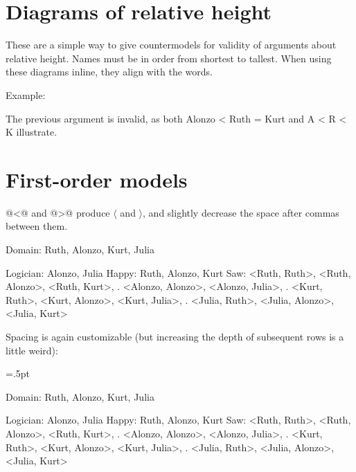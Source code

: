 \section{Diagrams of relative height}

\unorderedlist
\li These are a simple way to give countermodels for validity of arguments about relative height.
\li Names must be in order from shortest to tallest.
\li When using these diagrams inline, they align with the words.
\endunorderedlist

\noindent Example:

\noindent The previous argument is invalid, as both\quad
\heightmodel
 Alonzo < Ruth = Kurt
\endheightmodel
\quad and\quad
\heightmodelinitialbarheight=8pt%
\heightmodelbaradvance=4pt%
\heightmodelbarwidth=4pt%
\heightmodelspace=4pt%
\heightmodel
 A < R < K
\endheightmodel
\quad illustrate.

\pagebreak

\section{First-order models}

@<@ and @>@ produce $\langle$ and $\rangle$, and slightly decrease the space after commas between them.

\firstordermodel 
Domain:    Ruth, Alonzo, Kurt, Julia

Logician:  Alonzo, Julia
Happy:     Ruth, Alonzo, Kurt
Saw:       <Ruth, Ruth>, <Ruth, Alonzo>, <Ruth, Kurt>,
   .       <Alonzo, Alonzo>, <Alonzo, Julia>,
   .       <Kurt, Ruth>, <Kurt, Alonzo>, <Kurt, Julia>,
   .       <Julia, Ruth>, <Julia, Alonzo>, <Julia, Kurt>
\endfirstordermodel

\noindent Spacing is again customizable (but increasing the depth of subsequent rows is a little weird):

\fomodelfirstrowheight=18.5pt \fomodelfirstrowdepth=5.5pt%
\fomodelrowheight=16pt        \fomodelrowdepth=3.5pt%
\fomodelpadding=.5pt%
\fomodelspace=20pt%

\firstordermodel 
Domain:    Ruth, Alonzo, Kurt, Julia

Logician:  Alonzo, Julia
Happy:     Ruth, Alonzo, Kurt
Saw:       <Ruth, Ruth>, <Ruth, Alonzo>, <Ruth, Kurt>,
   .       <Alonzo, Alonzo>, <Alonzo, Julia>,
   .       <Kurt, Ruth>, <Kurt, Alonzo>, <Kurt, Julia>,
   .       <Julia, Ruth>, <Julia, Alonzo>, <Julia, Kurt>
\endfirstordermodel

\bye
